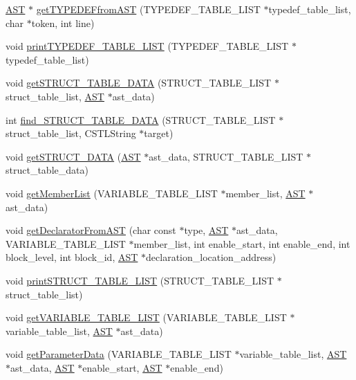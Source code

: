 \begin{DoxyCompactItemize}
\item 
\hyperlink{structabstract__syntax__tree}{AST} $\ast$ \hyperlink{Synbol_8h_a6d7fd082794fed9b030aaf19887da940}{getTYPEDEFfromAST} (TYPEDEF\_\-TABLE\_\-LIST $\ast$typedef\_\-table\_\-list, char $\ast$token, int line)
\item 
void \hyperlink{Synbol_8h_af74a1ea9bd21282292422f5c25a66d30}{printTYPEDEF\_\-TABLE\_\-LIST} (TYPEDEF\_\-TABLE\_\-LIST $\ast$typedef\_\-table\_\-list)
\item 
void \hyperlink{Synbol_8h_af79e414694270208cb0ac5c3e358eb68}{getSTRUCT\_\-TABLE\_\-DATA} (STRUCT\_\-TABLE\_\-LIST $\ast$struct\_\-table\_\-list, \hyperlink{structabstract__syntax__tree}{AST} $\ast$ast\_\-data)
\item 
int \hyperlink{Synbol_8h_ac3f428826e474fb1b0ca352b3ca011ab}{find\_\-STRUCT\_\-TABLE\_\-DATA} (STRUCT\_\-TABLE\_\-LIST $\ast$struct\_\-table\_\-list, CSTLString $\ast$target)
\item 
void \hyperlink{Synbol_8h_a1bd148c1aff660291572e425cffc8802}{getSTRUCT\_\-DATA} (\hyperlink{structabstract__syntax__tree}{AST} $\ast$ast\_\-data, STRUCT\_\-TABLE\_\-LIST $\ast$struct\_\-table\_\-data)
\item 
void \hyperlink{Synbol_8h_aafaf1504517931b7d80f1859acee3f5a}{getMemberList} (VARIABLE\_\-TABLE\_\-LIST $\ast$member\_\-list, \hyperlink{structabstract__syntax__tree}{AST} $\ast$ast\_\-data)
\item 
void \hyperlink{Synbol_8h_af36d024559f3450d5914bfa571343857}{getDeclaratorFromAST} (char const $\ast$type, \hyperlink{structabstract__syntax__tree}{AST} $\ast$ast\_\-data, VARIABLE\_\-TABLE\_\-LIST $\ast$member\_\-list, int enable\_\-start, int enable\_\-end, int block\_\-level, int block\_\-id, \hyperlink{structabstract__syntax__tree}{AST} $\ast$declaration\_\-location\_\-address)
\item 
void \hyperlink{Synbol_8h_ab938829024cd08a5cb8edde55af0d59a}{printSTRUCT\_\-TABLE\_\-LIST} (STRUCT\_\-TABLE\_\-LIST $\ast$struct\_\-table\_\-list)
\item 
void \hyperlink{Synbol_8h_ab993873ae14599a0a7ba57a81aad9cf3}{getVARIABLE\_\-TABLE\_\-LIST} (VARIABLE\_\-TABLE\_\-LIST $\ast$variable\_\-table\_\-list, \hyperlink{structabstract__syntax__tree}{AST} $\ast$ast\_\-data)
\item 
void \hyperlink{Synbol_8h_a2971c4a3533b56fd124ee6bbad16be26}{getParameterData} (VARIABLE\_\-TABLE\_\-LIST $\ast$variable\_\-table\_\-list, \hyperlink{structabstract__syntax__tree}{AST} $\ast$ast\_\-data, \hyperlink{structabstract__syntax__tree}{AST} $\ast$enable\_\-start, \hyperlink{structabstract__syntax__tree}{AST} $\ast$enable\_\-end)

\end{DoxyCompactItemize}
